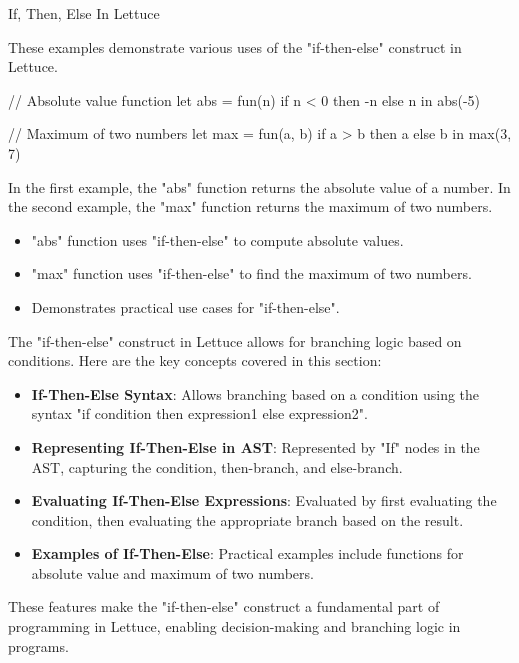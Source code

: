 \begin{notes}{If, Then, Else In Lettuce}
\begin{highlight}
        These examples demonstrate various uses of the "if-then-else" construct in Lettuce.
    
    \begin{code}[Lettuce]
    // Absolute value function
    let abs = fun(n) {
        if n < 0 then -n else n
    } in
    abs(-5)
    
    // Maximum of two numbers
    let max = fun(a, b) {
        if a > b then a else b
    } in
    max(3, 7)
    \end{code}
    
        In the first example, the "abs" function returns the absolute value of a number. In the second example, the "max" function returns the maximum of two numbers.
    
        \begin{itemize}
            \item "abs" function uses "if-then-else" to compute absolute values.
            \item "max" function uses "if-then-else" to find the maximum of two numbers.
            \item Demonstrates practical use cases for "if-then-else".
        \end{itemize}
    
    \end{highlight}
    
    \begin{highlight}
    
        The "if-then-else" construct in Lettuce allows for branching logic based on conditions. Here are the key concepts covered in this section:
    
        \begin{itemize}
            \item \textbf{If-Then-Else Syntax}: Allows branching based on a condition using the syntax "if condition then expression1 else expression2".
            \item \textbf{Representing If-Then-Else in AST}: Represented by "If" nodes in the AST, capturing the condition, then-branch, and else-branch.
            \item \textbf{Evaluating If-Then-Else Expressions}: Evaluated by first evaluating the condition, then evaluating the appropriate branch based on the result.
            \item \textbf{Examples of If-Then-Else}: Practical examples include functions for absolute value and maximum of two numbers.
        \end{itemize}
        
        These features make the "if-then-else" construct a fundamental part of programming in Lettuce, enabling decision-making and branching logic in programs.
    
    \end{highlight}
\end{notes}

